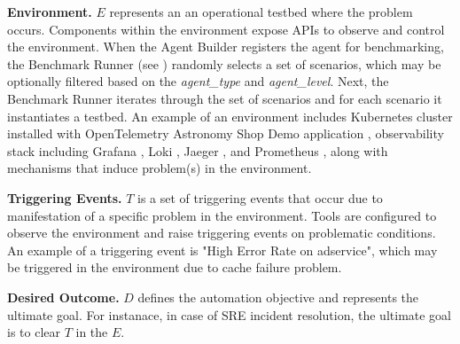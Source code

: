 \textbf{Environment.} $E$ represents an an operational testbed where the problem occurs. Components within the environment expose APIs to observe and control the environment. When the Agent Builder registers the agent for benchmarking, the Benchmark Runner (see ) randomly selects a set of scenarios, which may be optionally filtered based on the \textit{agent\_type} and \textit{agent\_level}. Next, the Benchmark Runner iterates through the set of scenarios and for each scenario it instantiates a testbed. An example of an environment includes Kubernetes cluster installed with OpenTelemetry Astronomy Shop Demo application \cite{otelastronomy}, observability stack including Grafana \cite{grafana}, Loki \cite{loki}, Jaeger \cite{jaeger}, and Prometheus \cite{prometheus}, along with mechanisms that induce problem(s) in the environment.

\textbf{Triggering Events.} $T$ is a set of triggering events that occur due to manifestation of a specific problem in the environment. Tools are configured to observe the environment and raise triggering events on problematic conditions. An example of a triggering event is "High Error Rate on adservice", which may be triggered in the environment due to cache failure problem.

\textbf{Desired Outcome.} $D$ defines the automation objective and represents the ultimate goal. For instanace, in case of SRE incident resolution, the ultimate goal is to clear $T$ in the $E$.














